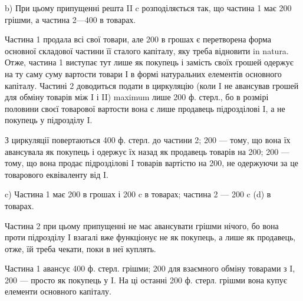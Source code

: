 b) При цьому припущенні решта II c розподіляється так, що частина
1 має 200 грішми, а частина 2—400 в товарах.

Частина 1 продала всі свої товари, але 200 в грошах є перетворена
форма основної складової частини її сталого капіталу, яку треба відновити
in natura. Отже, частина 1 виступає тут лише як покупець і замість
своїх грошей одержує на ту саму суму вартости товари І в формі натуральних
елементів основного капіталу. Частині 2 доводиться подати в
циркуляцію (коли I не авансував грошей для обміну товарів між I і II)
maximum лише 200 ф. стерл., бо в розмірі половини своєї товарової
вартости вона є лише продавець підрозділові I, а не покупець у
підрозділу I.

З циркуляції повертаються 400 ф. стерл. до частини 2; 200 — тому,
що вона їх авансувала як покупець і одержує їх назад як продавець
товарів на 200; 200 — тому, що вона продає підрозділові I товарів вартістю
на 200, не одержуючи за це товарового еквіваленту від I.

c) Частина 1 має 200 в грошах і 200 c в товарах; частина 2 —
200 c (d) в товарах.

Частина 2 при цьому припущенні не має авансувати грішми нічого,
бо вона проти підрозділу I взагалі вже функціонує не як покупець, а
лише як продавець, отже, їй треба чекати, поки в неї куплять.

Частина 1 авансує 400 ф. стерл. грішми; 200 для взаємного обміну
товарами з I, 200 — просто як покупець у I. На ці останні 200 ф. стерл.
грішми вона купує елементи основного капіталу.

